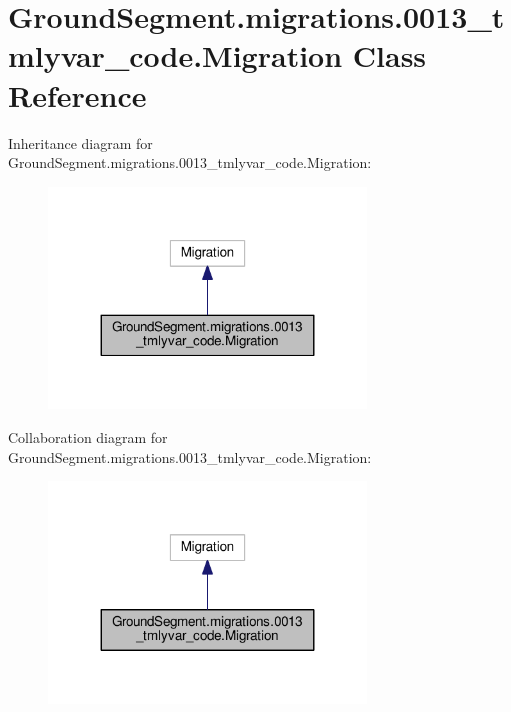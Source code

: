 \hypertarget{class_ground_segment_1_1migrations_1_10013__tmlyvar__code_1_1_migration}{}\section{Ground\+Segment.\+migrations.0013\+\_\+tmlyvar\+\_\+code.Migration Class Reference}
\label{class_ground_segment_1_1migrations_1_10013__tmlyvar__code_1_1_migration}


Inheritance diagram for Ground\+Segment.\+migrations.0013\+\_\+tmlyvar\+\_\+code.Migration\+:\nopagebreak
\begin{figure}[H]
\begin{center}
\leavevmode
\includegraphics[width=239pt]{class_ground_segment_1_1migrations_1_10013__tmlyvar__code_1_1_migration__inherit__graph}
\end{center}
\end{figure}


Collaboration diagram for Ground\+Segment.\+migrations.0013\+\_\+tmlyvar\+\_\+code.Migration\+:\nopagebreak
\begin{figure}[H]
\begin{center}
\leavevmode
\includegraphics[width=239pt]{class_ground_segment_1_1migrations_1_10013__tmlyvar__code_1_1_migration__coll__graph}
\end{center}
\end{figure}
